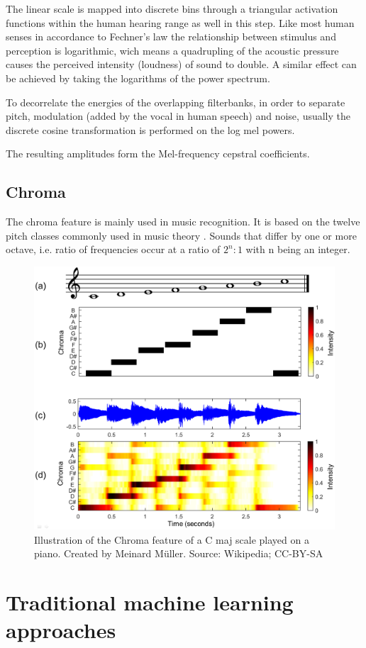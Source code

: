  The linear scale is mapped into discrete bins through a triangular activation functions within the human hearing range as well in this step. Like most human senses in accordance to Fechner’s law \cite{fechner1860} the relationship between stimulus and perception is logarithmic, wich means a quadrupling of the acoustic pressure causes the perceived intensity (loudness) of sound to double. A similar effect can be achieved by taking the logarithms of the power spectrum.
 

 To decorrelate the energies of the overlapping filterbanks, in order to separate pitch, modulation (added by the vocal in human speech) and noise, usually the discrete cosine transformation is performed on the log mel powers. %
 
 The resulting amplitudes form the Mel-frequency cepstral coefficients.

\subsection{Chroma}

The chroma feature is mainly used in music recognition. It is based on the twelve pitch classes commonly used in music theory \cite{Mller:2015:FMP:2815664}. Sounds that differ by one or more octave, i.e. ratio of frequencies occur at a ratio of $2^n : 1$ with n being an integer.


\begin{figure}[H]
    \centering
	\includegraphics[width=.5\textwidth]{./images/illustrations/chroma}
    \caption{Illustration of the Chroma feature of a C maj scale played on a piano. Created by Meinard Müller. Source: Wikipedia; CC-BY-SA}
    \label{fig:chroma}
\end{figure}



\section{Traditional machine learning approaches}



